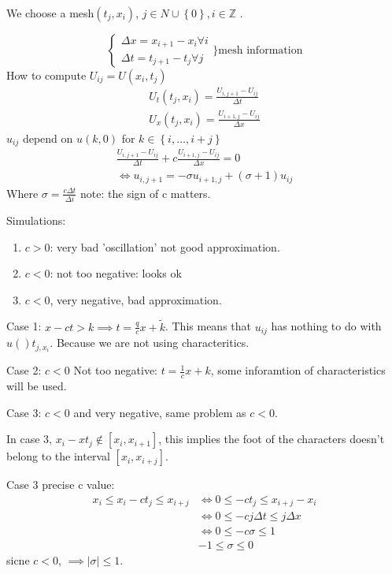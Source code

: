 \documentclass[a4paper]{article}
\theoremstyle{definition}
\begin{document}
We choose a mesh$\left( t_j,x_i \right) $, $j\in N \cup \left\{ 0 \right\} ,i\in \mathbb{Z}$ . 

\begin{equation}
	\begin{cases}
	\Delta x=x_{i+1}-x_i \forall i\\
	\Delta t=t_{j+1}-t_{j} \forall j
	\end{cases}
\Big\} \text{mesh information}
\end{equation} 
How to compute $U_{ij}=U\left( x_i,t_j \right) $
\begin{align*}
	U_t\left( t_j,x_i \right) =\frac{U_{i,j+1}-U_{ij}}{\Delta t}\\
	U_x\left( t_j,x_i \right) =\frac{U_{i+1,j}-U_{ij}}{\Delta x}
\end{align*} 
$u_{ij }$ depend on $u\left( k,0 \right) $ for $k\in \left\{ i,\ldots,i+j \right\} $
\begin{align*}
	\frac{U_{i,j+1}-U_{ij}}{\Delta t}+c \frac{U_{i+1,j}-U_{ij}}{\Delta x}=0\\
	\iff u_{i,j+1}=-\sigma u_{i+1,j}+\left( \sigma+1 \right) u_{ij}
\end{align*} 
Where $\sigma=\frac{c\Delta t}{ \Delta i}$ note: the sign of c matters. 

Simulations:
\begin{enumerate}
	\item $c>0$: very bad 'oscillation' not good approximation. 
	\item $c<0$: not too negative: looks ok
	\item $c<0$, very negative, bad approximation. 
\end{enumerate}
Case 1: $x-ct>k\implies t=\frac{q}{c }x+\tilde{k}$. This means that $u_{ij}$ has nothing to do with $u()t_{j,x_{i}}$. Because we are not using characteritics. 

Case 2: $c<0$ Not too negative: $t=\frac{1}{c}x+k$, some inforamtion of characteristics will be used. 

Case 3: $c<0$ and very negative, same problem as $c<0$. 

In case 3, $x_{i}-xt_{j} \not\in \left[ x_{i},x_{i+1} \right]  $, this implies the foot of the characters doesn't belong to the interval $\left[ x_{i},x_{i+j} \right] $. 

Case 3 precise c value: 
\begin{align*}
	x_{i }\le x_{i}-ct_{j}\le x_{i+j}& \iff 0\le -ct_j\le x_{i+j}-x_{i}\\
	&\iff 0\le-cj\Delta t\le j\Delta x\\
	&\iff 0\le -c\sigma \le 1\\
	&-1\le \sigma\le 0
\end{align*} 
sicne $c<0$, $\implies \left|\sigma \right|\le 1$. 
\end{document}
